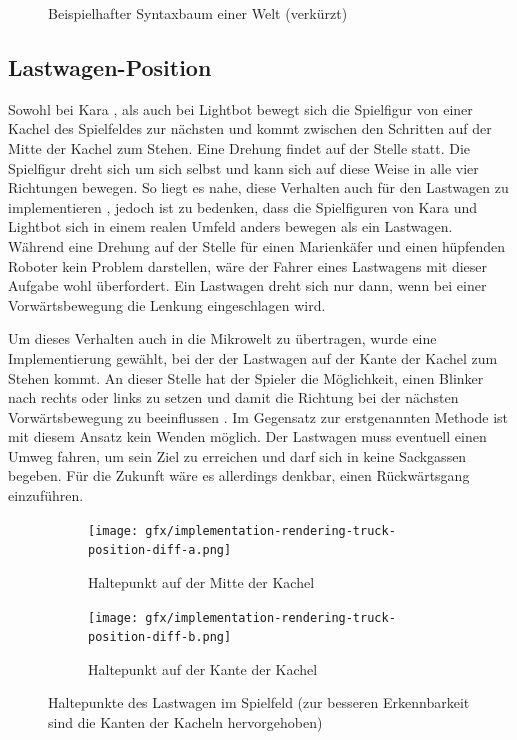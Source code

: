 \begin{figure}
  
  \caption{Beispielhafter Syntaxbaum einer Welt (verkürzt)}
  \label{fig:implementation:level-editor:tree}
\end{figure}

\subsection{Lastwagen-Position}
\label{sec:implementation:rendering:truck-position}

Sowohl bei Kara , als auch bei Lightbot  bewegt sich die Spielfigur von einer Kachel des Spielfeldes zur nächsten und kommt zwischen den Schritten auf der Mitte der Kachel zum Stehen. Eine Drehung findet auf der Stelle statt. Die Spielfigur dreht sich um sich selbst und kann sich auf diese Weise in alle vier Richtungen bewegen. So liegt es nahe, diese Verhalten auch für den Lastwagen zu implementieren , jedoch ist zu bedenken, dass die Spielfiguren von Kara und Lightbot sich in einem realen Umfeld anders bewegen als ein Lastwagen. Während eine Drehung auf der Stelle für einen Marienkäfer und einen hüpfenden Roboter kein Problem darstellen, wäre der Fahrer eines Lastwagens mit dieser Aufgabe wohl überfordert. Ein Lastwagen dreht sich nur dann, wenn bei einer Vorwärtsbewegung die Lenkung eingeschlagen wird.

Um dieses Verhalten auch in die Mikrowelt zu übertragen, wurde eine Implementierung gewählt, bei der der Lastwagen auf der Kante der Kachel zum Stehen kommt. An dieser Stelle hat der Spieler die Möglichkeit, einen Blinker nach rechts oder links zu setzen und damit die Richtung bei der nächsten Vorwärtsbewegung zu beeinflussen . Im Gegensatz zur erstgenannten Methode ist mit diesem Ansatz kein Wenden möglich. Der Lastwagen muss eventuell einen Umweg fahren, um sein Ziel zu erreichen und darf sich in keine Sackgassen begeben. Für die Zukunft wäre es allerdings denkbar, einen Rückwärtsgang einzuführen.

\begin{figure}
  \begin{subfigure}[b]{0.45\textwidth}
    \texttt{[image: gfx/implementation-rendering-truck-position-diff-a.png]}
    \caption{Haltepunkt auf der Mitte der Kachel}
    \label{fig:implementation:rendering:truck-position:diff:a}
  \end{subfigure}\hfill
  \begin{subfigure}[b]{0.45\textwidth}
    \texttt{[image: gfx/implementation-rendering-truck-position-diff-b.png]}
    \caption{Haltepunkt auf der Kante der Kachel}
    \label{fig:implementation:rendering:truck-position:diff:b}
  \end{subfigure}\hfill
  \caption{Haltepunkte des Lastwagen im Spielfeld (zur besseren Erkennbarkeit sind die Kanten der Kacheln hervorgehoben)}
  \label{fig:implementation:rendering:truck-position:diff}
\end{figure}

